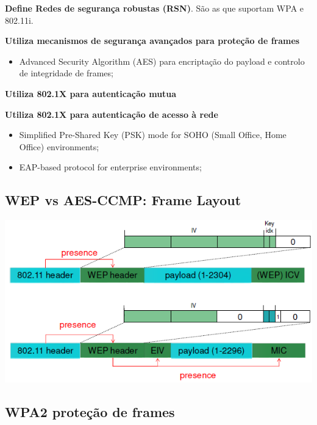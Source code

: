 \documentclass{article}
\begin{document}
\begin{flushleft}
  \textbf{Define Redes de segurança robustas (RSN)}.
  São as que suportam WPA e 802.11i.

  \vspace{2mm}

  \textbf{Utiliza mecanismos de segurança avançados para proteção de frames}
  \begin{itemize}
    \item Advanced Security Algorithm (AES) para encriptação do payload e
    controlo de integridade de frames;
  \end{itemize}

  \textbf{Utiliza 802.1X para autenticação mutua}

  \textbf{Utiliza 802.1X para autenticação de acesso à rede}
  \begin{itemize}
    \item Simplified Pre-Shared Key (PSK) mode for SOHO (Small Office, Home
    Office) environments;
    \item EAP-based protocol for enterprise environments;
  \end{itemize}
\end{flushleft}

\subsection{WEP vs AES-CCMP: Frame Layout}

\begin{center}
  \includegraphics[scale=0.6]{58}
\end{center}


\pagebreak

\subsection{WPA2 proteção de frames}
\end{document}
